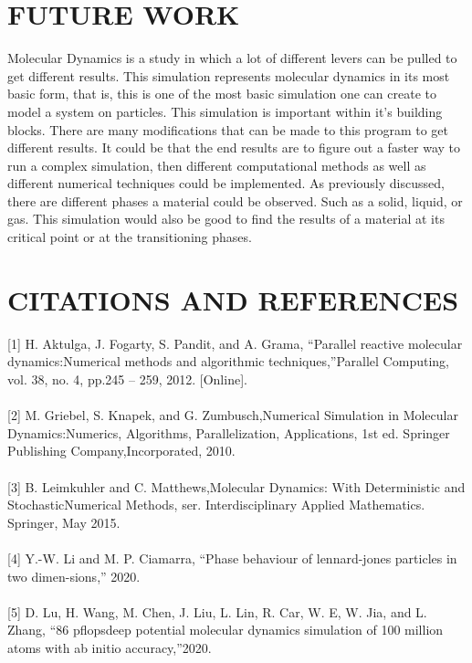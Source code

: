 \documentclass[reprint,amsmath,amssymb, aps, 10pt, a4paper, english, reqno]{revtex4-1}
\begin{document}
\begin{multicols}{2}
\section{\label{sec:level3}FUTURE WORK} 

Molecular Dynamics is a study in which a lot of different levers can be pulled to get different results. This simulation represents molecular dynamics in its most basic form, that is, this is one of the most basic simulation one can create to model a system on particles. This simulation is important within it's building blocks. There are many modifications that can be made to this program to get different results. It could be that the end results are to figure out a faster way to run a complex simulation, then different computational methods as well as different numerical techniques could be implemented. As previously discussed, there are different phases a material could be observed. Such as a solid, liquid, or gas. This simulation would also be good to find the results of a material at its critical point or at the transitioning phases.


\section{\label{sec:level3}CITATIONS AND REFERENCES}

[1]  H. Aktulga, J. Fogarty, S. Pandit, and A. Grama, “Parallel reactive molecular dynamics:Numerical methods and algorithmic techniques,”Parallel Computing,  vol. 38,  no. 4,  pp.245  –  259,  2012.  [Online].  \\

\\

[2]  M. Griebel, S. Knapek, and G. Zumbusch,Numerical Simulation in Molecular Dynamics:Numerics, Algorithms, Parallelization, Applications, 1st ed.  Springer Publishing Company,Incorporated, 2010. \\

\\

[3]  B. Leimkuhler and C. Matthews,Molecular Dynamics: With Deterministic and StochasticNumerical Methods, ser. Interdisciplinary Applied Mathematics.    Springer, May 2015. \\

\\

[4]  Y.-W. Li and M. P. Ciamarra, “Phase behaviour of lennard-jones particles in two dimen-sions,” 2020. \\

\\

[5]  D. Lu, H. Wang, M. Chen, J. Liu, L. Lin, R. Car, W. E, W. Jia, and L. Zhang, “86 pflopsdeep potential molecular dynamics simulation of 100 million atoms with ab initio accuracy,”2020. \\

\end{multicols}
\end{document}
